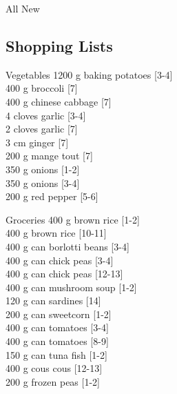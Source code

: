\begin{menu}{All New}
    \subsection*{Shopping Lists}
      \begin{shoppinglist}{Vegetables}
      1200 g baking potatoes 
        {\scriptsize[3-4]}\\
      400 g broccoli 
        {\scriptsize[7]}\\
      400 g chinese cabbage 
        {\scriptsize[7]}\\
      4 cloves garlic 
        {\scriptsize[3-4]}\\
      2 cloves garlic 
        {\scriptsize[7]}\\
      3 cm ginger 
        {\scriptsize[7]}\\
      200 g mange tout 
        {\scriptsize[7]}\\
      350 g onions 
        {\scriptsize[1-2]}\\
      350 g onions 
        {\scriptsize[3-4]}\\
      200 g red pepper 
        {\scriptsize[5-6]}\\
      \end{shoppinglist}%
      \begin{shoppinglist}{Groceries}
      400 g brown rice 
        {\scriptsize[1-2]}\\
      400 g brown rice 
        {\scriptsize[10-11]}\\
      400 g can borlotti beans 
        {\scriptsize[3-4]}\\
      400 g can chick peas 
        {\scriptsize[3-4]}\\
      400 g can chick peas 
        {\scriptsize[12-13]}\\
      400 g can mushroom soup 
        {\scriptsize[1-2]}\\
      120 g can sardines 
        {\scriptsize[14]}\\
      200 g can sweetcorn 
        {\scriptsize[1-2]}\\
      400 g can tomatoes 
        {\scriptsize[3-4]}\\
      400 g can tomatoes 
        {\scriptsize[8-9]}\\
      150 g can tuna fish 
        {\scriptsize[1-2]}\\
      400 g cous cous 
        {\scriptsize[12-13]}\\
      200 g frozen peas 
        {\scriptsize[1-2]}\\

\end{shoppinglist}
\end{menu}

